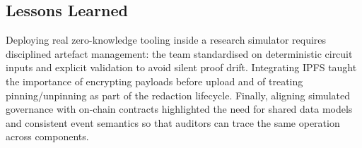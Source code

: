 \subsection{Lessons Learned}
Deploying real zero-knowledge tooling inside a research simulator requires disciplined artefact management: the team standardised on deterministic circuit inputs and explicit validation to avoid silent proof drift. Integrating IPFS taught the importance of encrypting payloads before upload and of treating pinning/unpinning as part of the redaction lifecycle. Finally, aligning simulated governance with on-chain contracts highlighted the need for shared data models and consistent event semantics so that auditors can trace the same operation across components.
